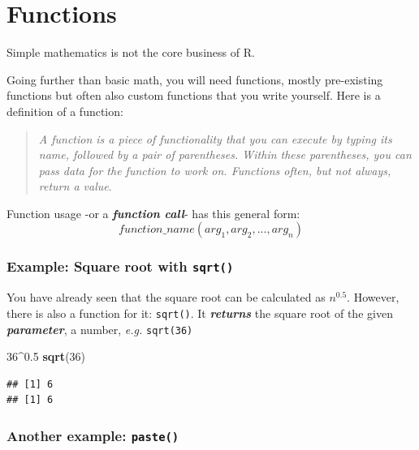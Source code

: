 \documentclass[]{book}
\newenvironment{Shaded}{\begin{snugshade}}{\end{snugshade}}
\newcommand{\DecValTok}[1]{\textcolor[rgb]{0.00,0.00,0.81}{#1}}
\newcommand{\FloatTok}[1]{\textcolor[rgb]{0.00,0.00,0.81}{#1}}
\newcommand{\KeywordTok}[1]{\textcolor[rgb]{0.13,0.29,0.53}{\textbf{#1}}}
\newcommand{\NormalTok}[1]{#1}
\newcommand{\OperatorTok}[1]{\textcolor[rgb]{0.81,0.36,0.00}{\textbf{#1}}}
\begin{document}
\hypertarget{functions}{%
\section{Functions}\label{functions}}

Simple mathematics is not the core business of R.

Going further than basic math, you will need functions, mostly pre-existing functions but often also custom functions that you write yourself. Here is a definition of a function:

\begin{quote}
\emph{A function is a piece of functionality that you can execute by typing its name, followed by a pair of parentheses. Within these parentheses, you can pass data for the function to work on. Functions often, but not always, return a value}.
\end{quote}

Function usage -or a \textbf{\emph{function call}}- has this general form:
\[function\_name(arg_1, arg_2, ..., arg_n)\]

\hypertarget{example-square-root-with-sqrt}{%
\subsubsection*{\texorpdfstring{Example: Square root with \texttt{sqrt()}}{Example: Square root with sqrt()}}\label{example-square-root-with-sqrt}}

You have already seen that the square root can be calculated as \(n^{0.5}\).
However, there is also a function for it: \texttt{sqrt()}. It \textbf{\emph{returns}} the square root of the given \textbf{\emph{parameter}}, a number, \emph{e.g.} \texttt{sqrt(36)}

\begin{Shaded}
\begin{Highlighting}[]
\DecValTok{36}\OperatorTok{^}\FloatTok{0.5}
\KeywordTok{sqrt}\NormalTok{(}\DecValTok{36}\NormalTok{)}
\end{Highlighting}
\end{Shaded}

\begin{verbatim}
## [1] 6
## [1] 6
\end{verbatim}

\hypertarget{another-example-paste}{%
\subsubsection*{\texorpdfstring{Another example: \texttt{paste()}}{Another example: paste()}}\label{another-example-paste}}
\end{document}
